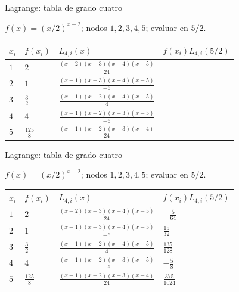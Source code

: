 \documentclass[main.tex]{subfiles}
\begin{document}
\begin{frame}[t]{Lagrange: tabla de grado cuatro}
\par\noindent\begin{minipage}[t][12mm][t]{\textwidth}\small\strut $f(x)=(x/2)^{x-2}$; nodos $1,2,3,4,5$; evaluar en $5/2$.\end{minipage}\par\nointerlineskip
\begingroup\scriptsize\setlength{\tabcolsep}{3pt}\begin{center}\begin{tabular}{|C{.06\textwidth}|C{.10\textwidth}|C{.48\textwidth}|C{.20\textwidth}|}\hline
\rule[-2mm]{0pt}{6mm}$x_i$&$f(x_i)$&$L_{4,i}(x)$&$f(x_i)L_{4,i}(5/2)$\\\hline
\rule[-2.5mm]{0pt}{7mm}$1$&$2$&$\frac{(x-2)(x-3)(x-4)(x-5)}{24}$&\\\hline
\rule[-2.5mm]{0pt}{7mm}$2$&$1$&$\frac{(x-1)(x-3)(x-4)(x-5)}{-6}$&\\\hline
\rule[-2.5mm]{0pt}{7mm}$3$&$\frac{3}{2}$&$\frac{(x-1)(x-2)(x-4)(x-5)}{4}$&\\\hline
\rule[-2.5mm]{0pt}{7mm}$4$&$4$&$\frac{(x-1)(x-2)(x-3)(x-5)}{-6}$&\\\hline
\rule[-2.5mm]{0pt}{7mm}$5$&$\frac{125}{8}$&$\frac{(x-1)(x-2)(x-3)(x-4)}{24}$&\\\hline
\end{tabular}\end{center}\endgroup\par

\end{frame}
\begin{frame}[t]{Lagrange: tabla de grado cuatro}
\par\noindent\begin{minipage}[t][12mm][t]{\textwidth}\small\strut $f(x)=(x/2)^{x-2}$; nodos $1,2,3,4,5$; evaluar en $5/2$.\end{minipage}\par\nointerlineskip
\begingroup\scriptsize\setlength{\tabcolsep}{3pt}\begin{center}\begin{tabular}{|C{.06\textwidth}|C{.10\textwidth}|C{.48\textwidth}|C{.20\textwidth}|}\hline
\rule[-2mm]{0pt}{6mm}$x_i$&$f(x_i)$&$L_{4,i}(x)$&$f(x_i)L_{4,i}(5/2)$\\\hline
\rule[-2.5mm]{0pt}{7mm}$1$&$2$&$\frac{(x-2)(x-3)(x-4)(x-5)}{24}$&$-\frac{5}{64}$\\\hline
\rule[-2.5mm]{0pt}{7mm}$2$&$1$&$\frac{(x-1)(x-3)(x-4)(x-5)}{-6}$&$\frac{15}{32}$\\\hline
\rule[-2.5mm]{0pt}{7mm}$3$&$\frac{3}{2}$&$\frac{(x-1)(x-2)(x-4)(x-5)}{4}$&$\frac{135}{128}$\\\hline
\rule[-2.5mm]{0pt}{7mm}$4$&$4$&$\frac{(x-1)(x-2)(x-3)(x-5)}{-6}$&$-\frac{5}{8}$\\\hline
\rule[-2.5mm]{0pt}{7mm}$5$&$\frac{125}{8}$&$\frac{(x-1)(x-2)(x-3)(x-4)}{24}$&$\frac{375}{1024}$\\\hline
\end{tabular}\end{center}\endgroup\par

\end{frame}
\end{document}
